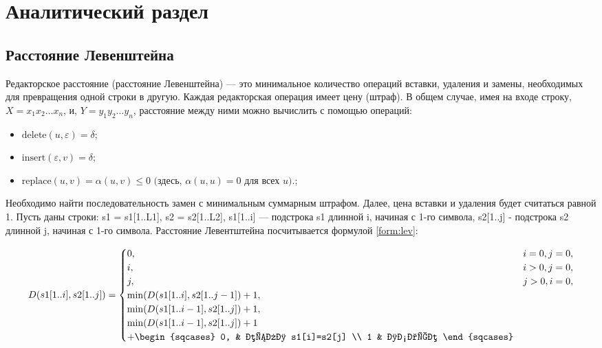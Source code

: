 \chapter{Аналитический раздел}\label{analyth}

\section{Расстояние Левенштейна}\label{defs}

Редакторское расстояние (расстояние Левенштейна) --- это минимальное количество операций вставки, удаления и замены, необходимых для превращения одной строки в другую. Каждая редакторская операция имеет цену (штраф). 
В общем случае, имея на входе строку, $X = x_1x_2 \dots x_n$, и, $Y = y_1y_2 \dots y_n$, расстояние между ними можно вычислить с помощью операций:
\begin{itemize}
	\item ${\text{delete}(u, \varepsilon) = \delta}$;
	\item $\text{insert}(\varepsilon, v) = \delta$;
	\item $\text{replace}(u, v) = \alpha(u, v) \leq 0$  $($здесь, $\alpha(u, u) = 0$ для всех $u).$;
\end{itemize}

Необходимо найти последовательность замен с минимальным суммарным штрафом. Далее, цена вставки и удаления будет считаться равной 1.
 Пусть даны строки: s1 = s1[1..L1], s2 = s2[1..L2], s1[1..i] --- подстрока s1 длинной i, начиная с 1-го символа, s2[1..j] - подстрока s2 длинной j, начиная с 1-го символа. Расстояние Левентштейна посчитывается формулой \ref{form:lev}:
 
\begin{equation}\label{form:lev}
	D(s1[1..i], s2[1..j]) =
	\begin{cases}
		0,       & i = 0, j =0,\\
		i,  & i > 0, j =0, \\
		j, & j > 0, i = 0, \\
		\min(D(s1[1..i], s2[1..j-1]) + 1,\\ 
		\min(D(s1[1..i-1], s2[1..j]) + 1, \\
		\min(D(s1[1..i-1], s2[1..j]) + 1 \\ + 
		\begin{sqcases}
			0, & если s1[i]=s2[j] \\
			1 & иначе
		\end{sqcases}
	\end{cases}
\end{equation}


